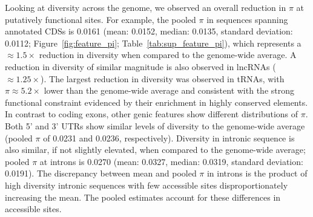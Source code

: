 Looking at diversity across the genome, we observed an overall reduction in $\pi$
at putatively functional sites. For example, the pooled $\pi$ in sequences spanning
annotated CDSs is 0.0161 (mean: 0.0152, median: 0.0135, standard deviation: 0.0112;
Figure~\ref{fig:feature_pi}; Table~\ref{tab:sup_feature_pi}),
which represents a $\approx1.5\times$ reduction in diversity when compared to the
genome-wide average. A reduction in diversity of similar magnitude is also observed
in lncRNAs ($\approx1.25\times$).
The largest reduction in diversity was observed in tRNAs, with
$\pi\approx5.2\times$ lower than the genome-wide average and consistent with the
strong functional constraint evidenced by their enrichment in highly conserved elements.
In contrast to coding exons, other genic features show different distributions of $\pi$.
Both 5' and 3' UTRs show similar levels of diversity to the genome-wide average
(pooled $\pi$ of 0.0231 and 0.0236, respectively).
Diversity in intronic sequence is also similar, if not slightly elevated, when compared
to the genome-wide average; pooled $\pi$ at introns is 0.0270 (mean: 0.0327, median: 0.0319,
standard deviation: 0.0191).
The discrepancy between mean and pooled $\pi$ in introns is the product of high diversity
intronic sequences with few accessible sites disproportionately increasing the mean.
The pooled estimates account for these differences in accessible sites.
\vspace{0.1cm}


